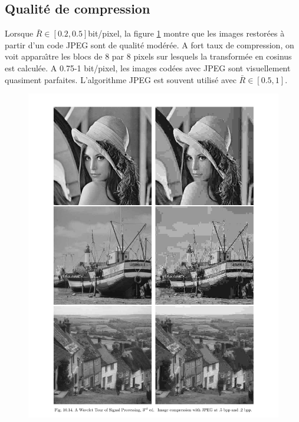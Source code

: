 \subsection*{Qualit\'e de compression}
Lorsque $\bar R \in [0.2,0.5]$bit/pixel, la figure \ref{JPEG-1} montre que
les images restor\'ees \`a partir d'un code JPEG sont de qualit\'e
mod\'er\'ee.
A fort taux de compression, on voit appara\^{\i}tre les blocs
de 8 par 8 pixels sur lesquels la transform\'ee en cosinus est
calcul\'ee.
A 0.75-1 bit/pixel, les images cod\'ees avec JPEG sont
visuellement quasiment parfaites. L'algorithme JPEG est
souvent utilis\'e avec $\bar R \in [0.5,1]$.
\newpage
\begin{figure}
\label{JPEG-1}
\includegraphics[width=\textwidth]{Figures/JPEG1}
\end{figure}
\newpage
